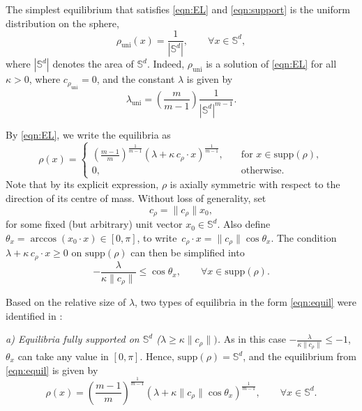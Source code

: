 \documentclass[11pt]{amsart}
\newcommand{\bbs}{\mathbb S}
\newcommand{\rhou}{\rho_{\mathrm{uni}}}
\newcommand{\supp}{\mathrm{supp}(\rho)}
\newcommand{\dm}{d} %
\begin{document}
The simplest equilibrium that satisfies \eqref{eqn:EL} and \eqref{eqn:support} is the uniform distribution on the sphere,
\begin{equation}
\label{eqn:rho-uni}
\rhou(x) = \frac{1}{|\bbs^\dm|}, \qquad \forall x \in \bbs^\dm,
\end{equation}
where $|\bbs^\dm|$ denotes the area of $\bbs^\dm$. Indeed, $\rhou$ is a solution of \eqref{eqn:EL} for all $\kappa>0$, where $c_{\rhou} =0$, and the constant $\lambda$ is given by
\begin{equation}
\label{eqn:lambda-uni}
\lambda_{\text{uni}} = \left(\frac{m}{m-1}\right) \frac{1}{|\bbs^\dm|^{m-1}}.
\end{equation}

By \eqref{eqn:EL}, we write the equilibria as
\begin{equation}
\label{eqn:equil}
\rho(x)=\begin{cases}
\left(\frac{m-1}{m} \right)^{\frac{1}{m-1}} \left(\lambda+\kappa\, c_\rho \cdot x\right)^{\frac{1}{m-1}},\quad &\text{for }x\in \mathrm{supp}(\rho),\\[5pt]
0,&\text{otherwise}.
\end{cases}
\end{equation}
Note that by its explicit expression, $\rho$ is axially symmetric with respect to the direction of its centre of mass. Without loss of generality, set 
\begin{equation}
\label{eqn:x0}
c_\rho=\|c_\rho\| x_0,
\end{equation}
for some fixed (but arbitrary) unit vector $x_0 \in \bbs^\dm$. Also define $\theta_x=\arccos ( x_0 \cdot x) \in [0,\pi]$, to write $\, c_\rho \cdot x=\|c_\rho\|\cos\theta_x$. The condition $\lambda+\kappa\, c_\rho \cdot x\geq0$ on $\mathrm{supp}(\rho)$ can then be simplified into
\begin{equation}
\label{ineq:cos}
-\frac{\lambda}{\kappa\|c_\rho\|}\leq\cos\theta_x, \qquad \forall x \in \mathrm{supp}(\rho).
\end{equation}

Based on the relative size of $\lambda$, two types of equilibria in the form \eqref{eqn:equil} were identified in \cite{FePaVa2025}:
\smallskip

{\em a) Equilibria fully supported on $\bbs^\dm$ ($\lambda \geq  \kappa \|c_\rho\|)$.} As in this case $-\frac{\lambda}{\kappa\|c_\rho\|}\leq -1$, $\theta_x$ can take any value in $[0,\pi]$. Hence, $\supp = \bbs^\dm$, and the equilibrium from \eqref{eqn:equil} is given by
\begin{equation}
\label{eqn:equil-fs}
\rho(x)=\left(\frac{m-1}{m}\right)^{\frac{1}{m-1}}\left(\lambda+\kappa\|c_\rho\|\cos\theta_x\right)^{\frac{1}{m-1}},\qquad\forall x\in \bbs^\dm.
\end{equation}
\end{document}
